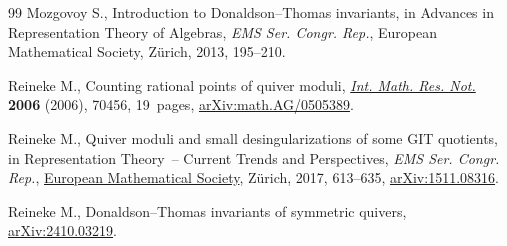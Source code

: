 \documentclass[pdftex]{sigma}
\numberwithin{equation}{section}
\theoremstyle{definition}
\begin{document}
\begin{thebibliography}{99}
Mozgovoy S., Introduction to {D}onaldson--{T}homas invariants, in Advances in
 {R}epresentation {T}heory of {A}lgebras, \textit{EMS Ser. Congr. Rep.}, European
 Mathematical Society, Z\"urich, 2013, 195--210.

Reineke M., Counting rational points of quiver moduli,
 \href{https://doi.org/10.1155/IMRN/2006/70456}{\textit{Int. Math. Res. Not.}}
 \textbf{2006} (2006), 70456, 19~pages,
 \href{http://arxiv.org/abs/math.AG/0505389}{arXiv:math.AG/0505389}.

Reineke M., Quiver moduli and small desingularizations of some {GIT} quotients,
 in Representation {T}heory~-- {C}urrent {T}rends and {P}erspectives, \textit{EMS Ser.
 Congr. Rep.}, \href{https://doi.org/10.4171/171-1/21}{European Mathematical
 Society}, Z\"urich, 2017, 613--635,
 \href{http://arxiv.org/abs/1511.08316}{arXiv:1511.08316}.

Reineke M., Donaldson--{T}homas invariants of symmetric quivers,
 \href{http://arxiv.org/abs/2410.03219}{arXiv:2410.03219}.

\end{thebibliography}\LastPageEnding
\end{document}
